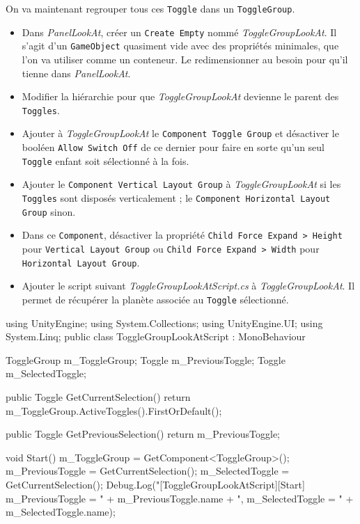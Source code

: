 \documentclass[a4paper,10pt]{article}
\newenvironment{solution}%
{\begin{tcolorbox}[breakable,colback=red!5!white,colframe=red!75!black,title=Solution]}%
{\end{tcolorbox}}
\newenvironment{boxcode}%
{\begin{tcolorbox}[breakable,colback=gray!5!white,colframe=black]}%
	{\end{tcolorbox}}
\begin{document}
\begin{solution}
On va maintenant regrouper tous ces \texttt{Toggle} dans un \texttt{ToggleGroup}.
\begin{itemize}
	\item Dans \textit{PanelLookAt}, créer un \texttt{Create Empty} nommé \textit{ToggleGroupLookAt}. Il s'agit d'un \texttt{GameObject} quasiment vide avec des propriétés minimales, que l'on va utiliser comme un conteneur. Le redimensionner au besoin pour qu'il tienne dans  \textit{PanelLookAt}.
	\item Modifier la hiérarchie pour que \textit{ToggleGroupLookAt} devienne le parent des \texttt{Toggles}.
	\item Ajouter à \textit{ToggleGroupLookAt} le \texttt{Component Toggle Group} et désactiver le booléen \texttt{Allow Switch Off} de ce dernier pour faire en sorte qu'un seul \texttt{Toggle} enfant soit sélectionné à la fois.
	\item Ajouter le \texttt{Component Vertical Layout Group} à \textit{ToggleGroupLookAt} si les \texttt{Toggles} sont disposés verticalement ; le \texttt{Component Horizontal Layout Group} sinon.
	\item Dans ce \texttt{Component}, désactiver la propriété \texttt{Child Force Expand > Height} pour \texttt{Vertical Layout Group} ou \texttt{Child Force Expand > Width} pour \texttt{Horizontal Layout Group}.
	\item Ajouter le script suivant \textit{ToggleGroupLookAtScript.cs} à \textit{ToggleGroupLookAt}. Il permet de récupérer la planète associée au \texttt{Toggle} sélectionné.
\end{itemize}

\begin{boxcode}
	\begin{csharpsansbord}
using UnityEngine;
using System.Collections;
using UnityEngine.UI;
using System.Linq;
public class ToggleGroupLookAtScript : MonoBehaviour {
  ToggleGroup m_ToggleGroup;
  Toggle m_PreviousToggle;
  Toggle m_SelectedToggle;
	
  public Toggle GetCurrentSelection() {
  	return m_ToggleGroup.ActiveToggles().FirstOrDefault();
  }
	
  public Toggle GetPreviousSelection() {
	return m_PreviousToggle;
  }
	
  void Start() {
	m_ToggleGroup = GetComponent<ToggleGroup>();
	m_PreviousToggle = GetCurrentSelection();
	m_SelectedToggle = GetCurrentSelection();
	Debug.Log("[ToggleGroupLookAtScript][Start] m_PreviousToggle = " +
	m_PreviousToggle.name + ", m_SelectedToggle = " +
	m_SelectedToggle.name);
  }
	
}
\end{csharpsansbord}
\end{boxcode}
\end{solution}
\end{document}
